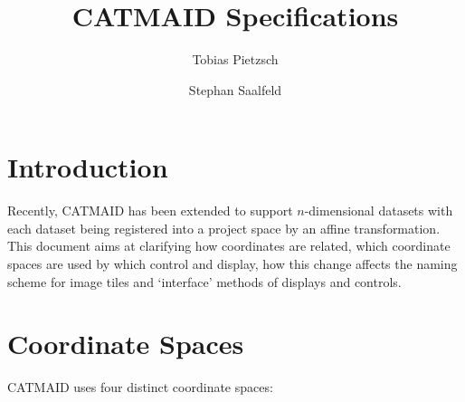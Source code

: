 \documentclass[a4paper,10pt]{article}
\title{CATMAID Specifications}
\author{Tobias Pietzsch \and Stephan Saalfeld}
\newcommand{\vc}[1]{\ensuremath{\mathbf{#1}}}
\newcommand{\mat}[1]{\ensuremath{\mathsf{#1}}}
\begin{document}
\maketitle


\section{Introduction}

Recently, CATMAID has been extended to support $n$-dimensional datasets with each dataset being registered into a project space by an affine transformation.  This document aims at clarifying how coordinates are related, which coordinate spaces are used by which control and display, how this change affects the naming scheme for image tiles and `interface' methods of displays and controls.


\section{Coordinate Spaces}

CATMAID uses four distinct coordinate spaces:

\newcommand{\xprj}{\vc{x}_p}
\newcommand{\xstack}{\vc{x}_s}
\newcommand{\xtile}{\vc{x}_t}
\newcommand{\rstack}{\vc{r}}
\newcommand{\Sstack}{\operatorname{diag}(\rstack)}
\newcommand{\Astack}{\mat{A}}
\newcommand{\tstack}{\vc{t}}
\newcommand{\toTile}{\operatorname{tile}}
\end{document}
